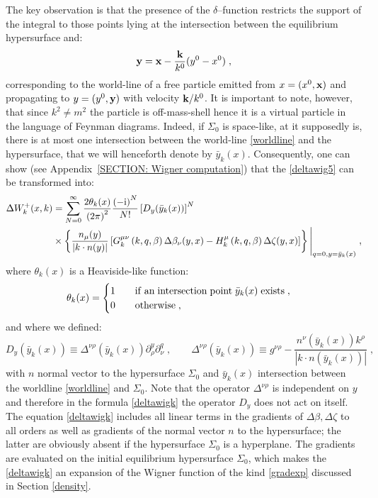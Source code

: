 \documentclass[prd,superscriptaddress,nofootinbib,notitlepage]{revtex4-1}
\newcommand{\ii}{{\rm i}}
\newcommand{\be}{\begin{equation}}
\newcommand{\ee}{\end{equation}}
\begin{document}
%
The key observation is that the presence of the $\delta$--function restricts the support of the integral to those points lying at 
the intersection between the equilibrium hypersurface and:
%
\begin{equation}\label{worldline}
    {\bf y} = {\bf x} - \frac{\bf k}{k^{0}}(y^0 - x^0)\;,
\end{equation}
%
corresponding to the world-line of a free particle emitted from $x=(x^0,{\bf x})$ and propagating to $y=(y^0,{\bf y})$ with velocity 
${\bf k}/k^0$. It is important to note, however, that since $k^2 \ne m^2$ the particle is off-mass-shell hence it is a virtual 
particle in the language of Feynman diagrams. Indeed, if $\Sigma_0$ is space-like, at it supposedly is, there is at most one 
intersection between the world-line \eqref{worldline} and the hypersurface, that we will henceforth denote by $\bar y_k(x)$. 
Consequently, one can show (see Appendix~\ref{SECTION: Wigner computation}) that the \eqref{deltawig5} can be transformed into:
%
\be\label{deltawigk}
\begin{split}
    \Delta W_k^+(x,k) &=\sum_{N=0}^{\infty} \frac{2\theta_k(x)}{\left(2\pi\right)^2}\frac{\left(-\ii \right)^N}{N!} 
\left[D_y(\bar{y}_k(x))\right]^N\\
&\times\left\{ \frac{n_{\mu}(y)}{|k\cdot n(y)|} \left[ G_k^{\mu\nu}\left(k,q,\beta\right) 
\Delta\beta_{\nu}(y,x) - H_k^\mu\left(k,q,\beta\right) \Delta \zeta(y,x) \right] \right\} \Bigg|_{q=0,y=\bar y_k(x)}\;,
\end{split}
\ee
%
where $\theta_k(x)$ is a Heaviside-like function:
%
$$
  \theta_k(x) = \begin{cases} 1 \qquad {\rm if \; an \; intersection \; point}\; \bar y_k(x) \; {\rm exists}\;, 
  \\ 0 \qquad {\rm otherwise}\;, \end{cases}
$$
%
and where we defined:
%
\begin{equation}\label{Dgrande1}
D_y(\bar y_k(x)) \equiv \Delta^{\nu\rho}(\bar y_k(x))
\partial_{\rho}^{y}\partial_{\nu}^{q}\;,\qquad \Delta^{\nu\rho}(\bar y_k(x))\equiv g^{\nu\rho}-
\frac{n^\nu(\bar{y}_k(x))k^\rho}{\left|k\cdot n(\bar y_k(x))\right|}\; ,
\end{equation}
%
with $n$ normal vector to the hypersurface  $\Sigma_0$ and $\bar y_k(x)$ intersection between the worldline \eqref{worldline} and $\Sigma_{0}$. 
Note that the operator $\Delta^{\nu\rho}$ is independent on $y$ and therefore in the formula \eqref{deltawigk} the operator 
$D_y$ does not act on itself. The equation \eqref{deltawigk} includes all linear terms in the gradients of $\Delta\beta, \Delta\zeta$ 
to all orders as well as gradients of the normal vector $n$ to the hypersurface; the latter are obviously absent if the hypersurface 
$\Sigma_0$ is a hyperplane. The gradients are evaluated on the initial equilibrium hypersurface $\Sigma_0$, which makes the \eqref{deltawigk}
an expansion of the Wigner function of the kind \eqref{gradexp} discussed in Section \ref{density}. 
\end{document}
